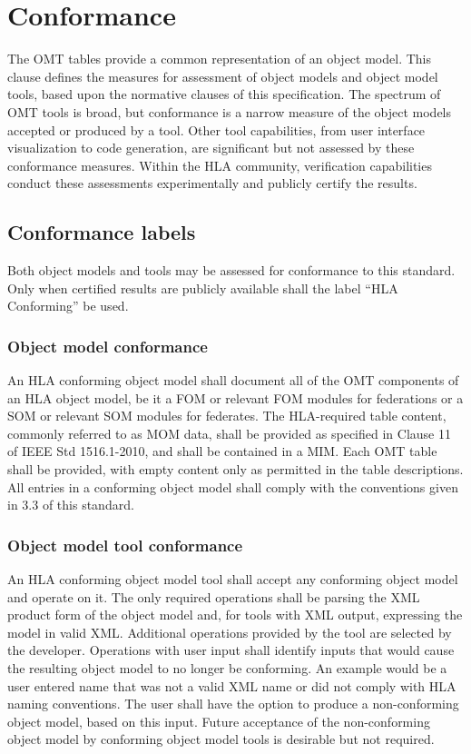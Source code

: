 \section{Conformance}
The OMT tables provide a common representation of an object model. This clause defines the measures for assessment of object models and object model tools, based upon the normative clauses of this specification. The spectrum of OMT tools is broad, but conformance is a narrow measure of the object models accepted or produced by a tool. Other tool capabilities, from user interface visualization to code generation, are significant but not assessed by these conformance measures. Within the HLA community, verification capabilities conduct these assessments experimentally and publicly certify the results.

\subsection{Conformance labels}
Both object models and tools may be assessed for conformance to this standard. Only when certified results are publicly available shall the label ``HLA Conforming'' be used.

\subsubsection{Object model conformance}
An HLA conforming object model shall document all of the OMT components of an HLA object model, be it a FOM or relevant FOM modules for federations or a SOM or relevant SOM modules for federates. The HLA-required table content, commonly referred to as MOM data, shall be provided as specified in Clause 11 of IEEE Std 1516.1-2010, and shall be contained in a MIM. Each OMT table shall be provided, with empty content only as permitted in the table descriptions. All entries in a conforming object model shall comply with the conventions given in 3.3 of this standard.

\newpage

\subsubsection{Object model tool conformance}
An HLA conforming object model tool shall accept any conforming object model and operate on it. The only required operations shall be parsing the XML product form of the object model and, for tools with XML output, expressing the model in valid XML. Additional operations provided by the tool are selected by the developer. Operations with user input shall identify inputs that would cause the resulting object model to no longer be conforming. An example would be a user entered name that was not a valid XML name or did not comply with HLA naming conventions. The user shall have the option to produce a non-conforming object model, based on this input. Future acceptance of the non-conforming object model by conforming object model tools is desirable but not required.

